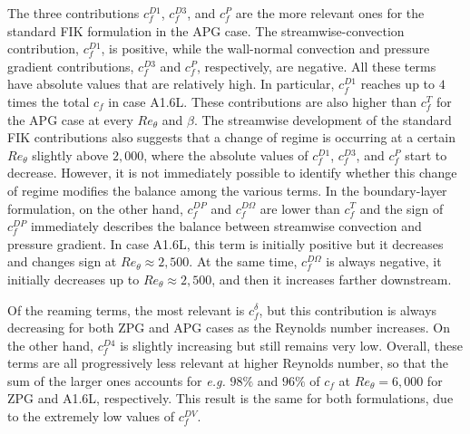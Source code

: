 The three contributions $c^{D1}_f$, $c^{D3}_f$, and $c^{P}_f$ are the more relevant ones for the standard FIK formulation in the APG case. The streamwise-convection contribution, $c^{D1}_f$, is positive, while the wall-normal convection and pressure gradient contributions, $c^{D3}_f$ and $c^{P}_f$, respectively, are negative. All these terms have absolute values that are relatively high. In particular, $c^{D1}_f$ reaches up to $4$ times the total $c_f$ in case A1.6L. These contributions are also higher than $c^T_f$ for the APG case at every $Re_\theta$ and $\beta$. The streamwise development of the standard FIK contributions also suggests that a change of regime is occurring at a certain $Re_\theta$ slightly above $2,000$, where the absolute values of $c^{D1}_f$, $c^{D3}_f$, and $c^{P}_f$ start to decrease. However, it is not immediately possible to identify whether this change of regime modifies the balance among the various terms. In the boundary-layer formulation, on the other hand, $c^{DP}_f$ and $c^{D\Omega}_f$ are lower than $c^T_f$ and the sign of $c^{DP}_f$ immediately describes the balance between streamwise convection and pressure gradient. In case A1.6L, this term is initially positive but it decreases and changes sign at  $Re_\theta\approx2,500$. At the same time, $c^{D\Omega}_f$ is always negative, it initially decreases up to $Re_\theta\approx2,500$, and then it increases farther downstream. 


Of the reaming terms, the most relevant is $c^\delta_f$, but this contribution is always decreasing for both ZPG and APG cases as the Reynolds number increases. On the other hand, $c^{D4}_f$ is slightly increasing but still remains very low. Overall, these terms are all progressively less relevant at higher Reynolds number, so that the sum of the larger ones accounts for \textit{e.g.} $98\%$ and $96\%$ of $c_f$ at $Re_\theta=6,000$ for ZPG and A1.6L, respectively. This result is the same for both formulations, due to the extremely low values of $c^{DV}_f$. 



